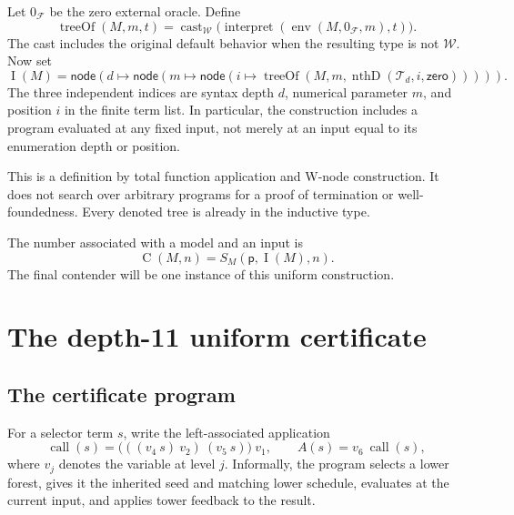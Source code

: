 \documentclass[11pt,letterpaper]{article}
\theoremstyle{definition}
\newcommand{\W}{\mathcal W}
\newcommand{\Fam}{\mathcal F}
\newcommand{\Val}{\operatorname{C}}
\newcommand{\idx}{\operatorname{I}}
\newcommand{\td}{\operatorname{treeOf}}
\newcommand{\ps}{\mathsf p}
\begin{document}
Let $0_{\Fam}$ be the zero external oracle. Define
\[
 \td(M,m,t)=\operatorname{cast}_{\W}
     \bigl(\operatorname{interpret}(\operatorname{env}(M,0_{\Fam},m),t)\bigr).
\]
The cast includes the original default behavior when the resulting type is
not $\W$. Now set
\begin{equation}\label{eq:index}
 \idx(M)=\mathsf{node}\left(d\mapsto
  \mathsf{node}\left(m\mapsto
   \mathsf{node}\left(i\mapsto
       \td(M,m,\operatorname{nthD}(\mathcal T_d,i,\mathsf{zero}))
             \right)\right)\right).
\end{equation}
The three independent indices are syntax depth $d$, numerical parameter $m$,
and position $i$ in the finite term list. In particular, the construction
includes a program evaluated at any fixed input, not merely at an input
equal to its enumeration depth or position.

This is a definition by total function application and W-node construction.
It does not search over arbitrary programs for a proof of termination or
well-foundedness. Every denoted tree is already in the inductive type.

The number associated with a model and an input is
\begin{equation}\label{eq:value}
                 \Val(M,n)=S_M(\ps,\idx(M),n).
\end{equation}
The final contender will be one instance of this uniform construction.

\section{The depth-11 uniform certificate}
\label{sec:certificate}

\subsection{The certificate program}

For a selector term $s$, write the left-associated application
\begin{equation}\label{eq:call}
 \operatorname{call}(s)=
       \bigl(((v_4\ s)\ v_2)\ (v_5\ s)\bigr)\ v_1,
 \qquad
 A(s)=v_6\ \operatorname{call}(s),
\end{equation}
where $v_j$ denotes the variable at level $j$. Informally, the program selects
a lower forest, gives it the inherited seed and matching lower schedule,
evaluates at the current input, and applies tower feedback to the result.
\end{document}
